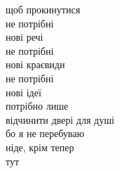 щоб прокинутися\\

не потрібні\\
нові речі\\
не потрібні\\
нові краєвиди\\
не потрібні\\
нові ідеї\\

потрібно лише\\
відчинити двері для душі\\

бо я не перебуваю\\
ніде, крім тепер\\
тут\\
